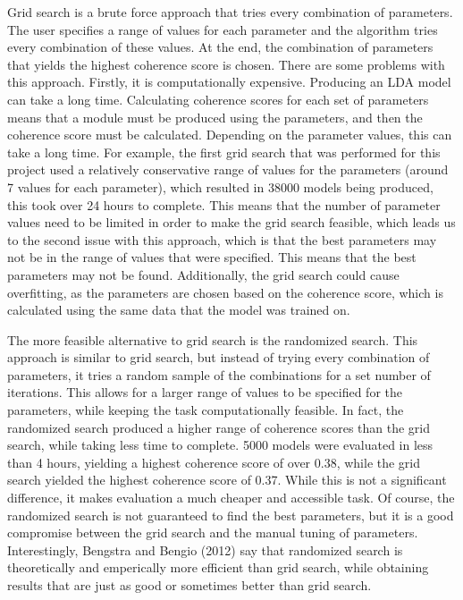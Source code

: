 Grid search is a brute force approach that tries every combination of parameters. The user specifies a range of values for each parameter and the algorithm tries every combination of these values. At the end, the combination of parameters that yields the highest coherence score is chosen. There are some problems with this approach. Firstly, it is computationally expensive. Producing an LDA model can take a long time. Calculating coherence scores for each set of parameters means that a module must be produced using the parameters, and then the coherence score must be calculated. Depending on the parameter values, this can take a long time. For example, the first grid search that was performed for this project used a relatively conservative range of values for the parameters (around 7 values for each parameter), which resulted in 38000 models being produced, this took over 24 hours to complete. This means that the number of parameter values need to be limited in order to make the grid search feasible, which leads us to the second issue with this approach, which is that the best parameters may not be in the range of values that were specified. This means that the best parameters may not be found. Additionally, the grid search could cause overfitting, as the parameters are chosen based on the coherence score, which is calculated using the same data that the model was trained on.

The more feasible alternative to grid search is the randomized search. This approach is similar to grid search, but instead of trying every combination of parameters, it tries a random sample of the combinations for a set number of iterations. This allows for a larger range of values to be specified for the parameters, while keeping the task computationally feasible. In fact, the randomized search produced a higher range of coherence scores than the grid search, while taking less time to complete. 5000 models were evaluated in less than 4 hours, yielding a highest coherence score of over 0.38, while the grid search yielded the highest coherence score of 0.37. While this is not a significant difference, it makes evaluation a much cheaper and accessible task. Of course, the randomized search is not guaranteed to find the best parameters, but it is a good compromise between the grid search and the manual tuning of parameters. Interestingly, Bengstra and Bengio (2012) say that randomized search is theoretically and emperically more efficient than grid search, while obtaining results that are just as good or sometimes better than grid search.~\cite{bergstra2012random}

